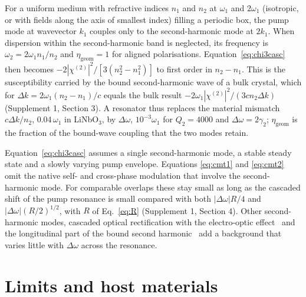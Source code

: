 \documentclass{optica-article}
\newcommand{\chitwo}{\chi^{(2)}}
\newcommand{\Dom}{\Delta\omega}
\newcommand{\etag}{\eta_{\mathrm{geom}}}
\begin{document}
For a uniform medium with refractive indices $n_1$ and $n_2$ at
$\omega_1$ and $2\omega_1$ (isotropic, or with fields along the axis of
smallest index) filling a periodic box, the pump mode at
wavevector $k_1$ couples only to the second-harmonic mode at $2k_1$.  When
dispersion within the second-harmonic band is neglected, its frequency is
$\omega_2=2\omega_1n_1/n_2$ and $\etag=1$ for aligned polarisations.
Equation~\eqref{eq:chi3casc} then becomes $-2|\chitwo|^2/[3(n_2^2-n_1^2)]$
to first order in $n_2-n_1$.  This is the susceptibility carried by the
bound second-harmonic wave of a bulk crystal, which for
$\Delta k=2\omega_1(n_2-n_1)/c$ equals the bulk result
$-2\omega_1|\chitwo|^2/(3cn_2\Delta k)$~\cite{desalvo1992,stegeman1996}
(Supplement 1, Section 3).  A resonator thus replaces the material
mismatch $c\Delta k/n_2$, $0.04\,\omega_1$ in LiNbO$_3$, by $\Dom$,
$10^{-3}\omega_1$ for $Q_2=4000$ and $\Dom=2\gamma_2$; $\etag$
is the fraction of the bound-wave coupling that the two modes retain.

Equation~\eqref{eq:chi3casc} assumes a single second-harmonic mode, a
stable steady state and a slowly varying pump envelope.  Equations
\eqref{eq:cmt1} and \eqref{eq:cmt2} omit the native self- and cross-phase
modulation that involve the second-harmonic mode.  For comparable overlaps
these stay small as long as the cascaded shift of the pump resonance is small
compared with both $|\Dom|R/4$ and $|\Dom|(R/2)^{1/2}$, with $R$ of
Eq.~\eqref{eq:R} (Supplement 1, Section 4).  Other second-harmonic modes, cascaded optical rectification
with the electro-optic effect~\cite{bosshard1995} and the longitudinal part
of the bound second harmonic~\cite{kolleck2004} add a background that varies
little with $\Dom$ across the resonance.


\section{Limits and host materials}\label{sec:limits}
\end{document}
